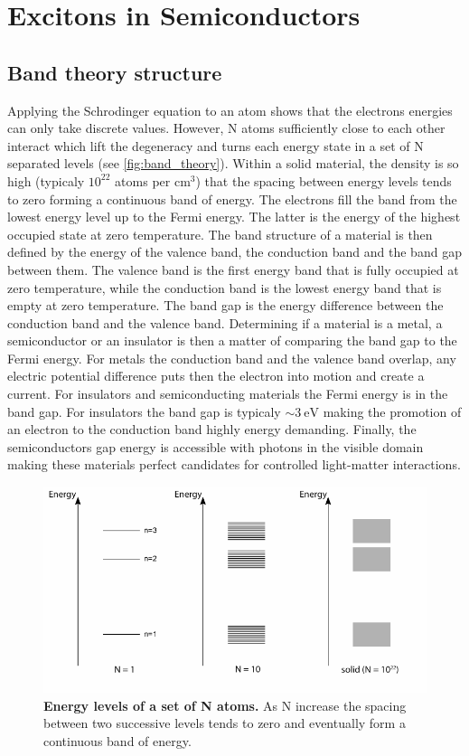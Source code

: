 \section{Excitons in Semiconductors}

\subsection{Band theory structure}

Applying the Schrodinger equation to an atom shows that the electrons energies can only take discrete values. However, N atoms sufficiently close to each other interact which lift the degeneracy and 
turns each energy state in a set of N separated levels (see \autoref{fig:band_theory}). 
Within a solid material, the density is so high (typicaly $10^{22}$ atoms per cm$^3$) that the spacing between energy levels tends to zero forming a continuous band of energy. 
The electrons fill the band from the lowest energy level up to the Fermi energy. The latter is the energy of the highest occupied state at zero temperature. 
The band structure of a material is then defined by the energy of the valence band, the conduction band and the band gap between them. The valence band is the first energy band that is fully occupied at zero temperature, while the conduction band is the lowest energy band that is empty at zero temperature. The band gap is the energy difference between the conduction band and the valence band. 
Determining if a material is a metal, a semiconductor or an insulator is then a matter of comparing the band gap to the Fermi energy.
For metals the conduction band and the valence band overlap, any electric potential difference puts then the electron into motion and create a current. For insulators and semiconducting materials the Fermi energy is in the band gap. For insulators the band gap is typicaly $\sim 3 \ \mathrm{eV}$ making the promotion of an electron to the conduction band highly energy demanding. 
Finally, the semiconductors gap energy is accessible with photons in the visible domain making these materials perfect candidates for controlled light-matter interactions.

\begin{figure}[h]
    \centering
    \includegraphics[width=1\linewidth]{chap_theory/fig/band_theory.pdf}
    \caption{\textbf{Energy levels of a set of N atoms.} As N increase the spacing between two successive levels tends to zero and eventually form a continuous band of energy.}
    \label{fig:band_theory}
\end{figure}

